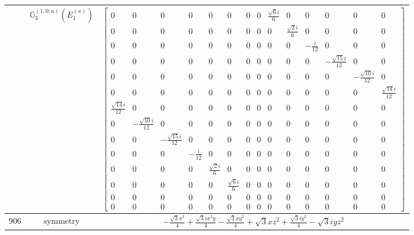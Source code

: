 \documentclass[fleqn,8pt,landscape]{jsarticle}
\begin{document}
\begin{longtable}{ccc}
$  $ & $ \mathbb{G}_{3}^{(1,0;a)}(E_{1}^{(a)}) $ & $ \begin{bmatrix} 0 & 0 & 0 & 0 & 0 & 0 & 0 & 0 & \frac{\sqrt{6} i}{6} & 0 & 0 & 0 & 0 & 0 \\ 0 & 0 & 0 & 0 & 0 & 0 & 0 & 0 & 0 & \frac{\sqrt{2} i}{6} & 0 & 0 & 0 & 0 \\ 0 & 0 & 0 & 0 & 0 & 0 & 0 & 0 & 0 & 0 & - \frac{i}{12} & 0 & 0 & 0 \\ 0 & 0 & 0 & 0 & 0 & 0 & 0 & 0 & 0 & 0 & 0 & - \frac{\sqrt{15} i}{12} & 0 & 0 \\ 0 & 0 & 0 & 0 & 0 & 0 & 0 & 0 & 0 & 0 & 0 & 0 & - \frac{\sqrt{10} i}{12} & 0 \\ 0 & 0 & 0 & 0 & 0 & 0 & 0 & 0 & 0 & 0 & 0 & 0 & 0 & \frac{\sqrt{14} i}{12} \\ \frac{\sqrt{14} i}{12} & 0 & 0 & 0 & 0 & 0 & 0 & 0 & 0 & 0 & 0 & 0 & 0 & 0 \\ 0 & - \frac{\sqrt{10} i}{12} & 0 & 0 & 0 & 0 & 0 & 0 & 0 & 0 & 0 & 0 & 0 & 0 \\ 0 & 0 & - \frac{\sqrt{15} i}{12} & 0 & 0 & 0 & 0 & 0 & 0 & 0 & 0 & 0 & 0 & 0 \\ 0 & 0 & 0 & - \frac{i}{12} & 0 & 0 & 0 & 0 & 0 & 0 & 0 & 0 & 0 & 0 \\ 0 & 0 & 0 & 0 & \frac{\sqrt{2} i}{6} & 0 & 0 & 0 & 0 & 0 & 0 & 0 & 0 & 0 \\ 0 & 0 & 0 & 0 & 0 & \frac{\sqrt{6} i}{6} & 0 & 0 & 0 & 0 & 0 & 0 & 0 & 0 \\ 0 & 0 & 0 & 0 & 0 & 0 & 0 & 0 & 0 & 0 & 0 & 0 & 0 & 0 \\ 0 & 0 & 0 & 0 & 0 & 0 & 0 & 0 & 0 & 0 & 0 & 0 & 0 & 0 \end{bmatrix} $ \\ \hline
$ 906 $ & $ \text{symmetry} $ & $ - \frac{\sqrt{3} x^{3}}{4} + \frac{\sqrt{3} i x^{2} y}{4} - \frac{\sqrt{3} x y^{2}}{4} + \sqrt{3} x z^{2} + \frac{\sqrt{3} i y^{3}}{4} - \sqrt{3} i y z^{2} $ \\

\end{longtable}
\end{document}
